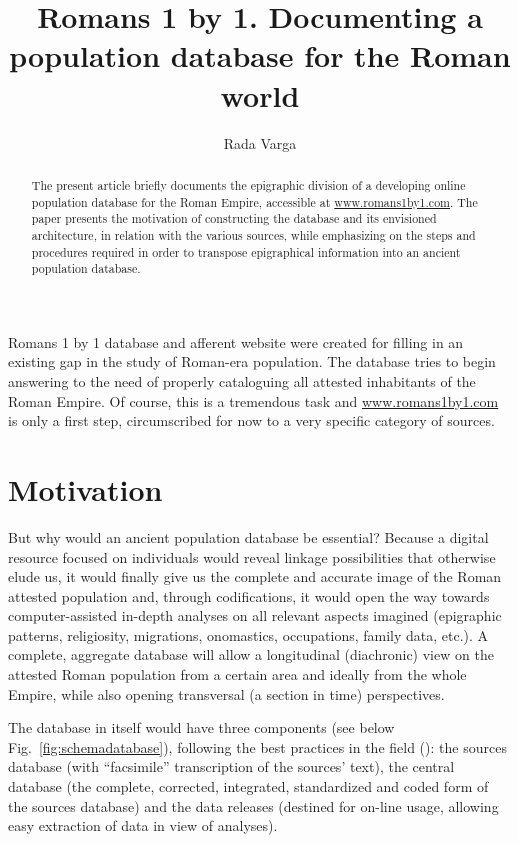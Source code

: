 \documentclass[amsthm,ebook]{saparticle}
\title{Romans 1 by 1. Documenting a population database for the Roman world}
\author[VARGA]{Rada Varga}
\begin{document}
\maketitle

\begin{abstract}
 The present article briefly documents the epigraphic division of a developing online population database for the Roman
Empire, accessible at \url{www.romans1by1.com}. The paper presents the motivation of constructing the database and its
envisioned architecture, in relation with the various sources, while emphasizing on the steps and procedures required
in order to transpose epigraphical information into an ancient population database. 
\end{abstract}



\noindent Romans 1 by 1 database and afferent website were created for filling in an existing gap in the study of Roman-era
population. The database tries to begin answering to the need of properly cataloguing all attested inhabitants of the
Roman Empire. Of course, this is a tremendous task and \url{www.romans1by1.com} is only a first step, circumscribed for now
to a very specific category of sources.


\section{Motivation}


\noindent But why would an ancient population database be essential? Because a digital resource focused on individuals would
reveal linkage possibilities that otherwise elude us, it would finally give us the complete and accurate image of the
Roman attested population and, through codifications, it would open the way towards computer-assisted in-depth analyses
on all relevant aspects imagined (epigraphic patterns, religiosity, migrations, onomastics, occupations, family data,
etc.). A complete, aggregate database will allow a longitudinal (diachronic) view on the attested Roman population from
a certain area and ideally from the whole Empire, while also opening transversal (a section in time) perspectives.

The database in itself would have three components (see below Fig.~\ref{fig:schemadatabase}), following the best practices in the field
(\citet{doi:10.3200/HMTS.37.1.34-38}): the sources database (with ``facsimile'' transcription of the sources’ text), the central
database (the complete, corrected, integrated, standardized and coded form of the sources database) and the data
releases (destined for on-line usage, allowing easy extraction of data in view of analyses). 
\end{document}
